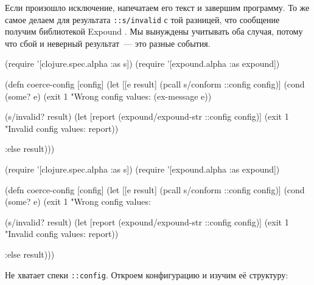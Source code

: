 Если произошло исключение, напечатаем его текст и завершим программу. То же
самое делаем для результата \verb|::s/invalid| с той разницей, что сообщение
получим библиотекой Expound . Мы вынуждены учитывать оба случая,
потому что сбой и неверный результат~--- это разные события.

\ifnarrow

\begin{english}
  \begin{clojure}
(require '[clojure.spec.alpha :as s])
(require '[expound.alpha :as expound])

(defn coerce-config [config]
  (let [[e result] (pcall s/conform
                     ::config config)]
    (cond
      (some? e)
      (exit 1 "Wrong config values: %
        (ex-message e))

      (s/invalid? result)
      (let [report (expound/expound-str
                     ::config config)]
        (exit 1
          "Invalid config values: %
          \newline report))

      :else result)))
  \end{clojure}
\end{english}

\else

\begin{english}
  \begin{clojure}
(require '[clojure.spec.alpha :as s])
(require '[expound.alpha :as expound])
  \end{clojure}
\end{english}

\pagebreaklarge

\begin{english}
  \begin{clojure}
(defn coerce-config [config]
  (let [[e result] (pcall s/conform ::config config)]
    (cond
      (some? e)
      (exit 1 "Wrong config values: %

      (s/invalid? result)
      (let [report (expound/expound-str ::config config)]
        (exit 1 "Invalid config values: %
              \newline report))

      :else result)))
  \end{clojure}
\end{english}

\fi

Не хватает спеки \verb|::config|. Откроем конфигурацию и изучим её структуру:

